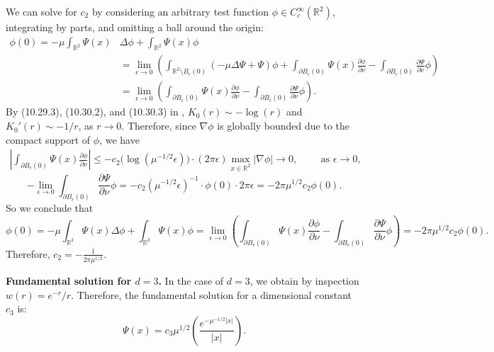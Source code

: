 \documentclass[12pt]{article}
\def\R{{\mathbb R}}
\theoremstyle{plain}
\begin{document}
We can solve for $c_{2}$ by considering an arbitrary test function $\phi \in C_{c}^{\infty}(\R^{2})$, integrating by parts, and omitting a ball around the origin:
\begin{align*}
\phi(0) = -\mu \int_{\R^{2}} \Psi(x)& \Delta \phi + \int_{\R^{2}} \Psi(x) \phi \\
&= \lim_{\epsilon \to 0} \left(\int_{\R^{2} \setminus B_{\epsilon}(0)} (-\mu \Delta \Psi + \Psi) \phi + \int_{\partial B_{\epsilon}(0)} \Psi(x) \frac{\partial \phi}{\partial \nu} - \int_{\partial B_{\epsilon}(0)} \frac{\partial \Psi}{\partial \nu} \phi\right) \\
&= \lim_{\epsilon \to 0} \left(\int_{\partial B_{\epsilon}(0)} \Psi(x) \frac{\partial \phi}{\partial \nu} - \int_{\partial B_{\epsilon}(0)} \frac{\partial \Psi}{\partial \nu} \phi\right).
\end{align*}
By (10.29.3), (10.30.2), and (10.30.3) in \cite{DLMF}, $K_{0}(r) \sim -\log(r)$ and $K_{0}'(r) \sim -1/r$, as $r \to 0$. Therefore, since $\nabla \phi$ is globally bounded due to the compact support of $\phi$, we have
\begin{align}\label{smoothgreen1}
\left|\int_{\partial B_{\epsilon}(0)} \Psi(x)\frac{\partial \phi}{\partial \nu}\right| \le -c_{2} \Big(\log(\mu^{-1/2} \epsilon)\Big) \cdot (2\pi \epsilon) \max_{x \in \R^{2}} |\nabla \phi| \to 0, \qquad \text{ as } \epsilon \to 0,
\end{align}
\begin{equation*}
-\lim_{\epsilon \to 0} \int_{\partial B_{\epsilon}(0)} \frac{\partial \Psi}{\partial \nu} \phi = -c_{2} (\mu^{-1/2} \epsilon)^{-1} \cdot \phi(0) \cdot 2\pi \epsilon = -2\pi\mu^{1/2} c_{2}\phi(0).
\end{equation*}
So we conclude that
\begin{equation*}
\phi(0) = -\mu \int_{\R^{2}} \Psi(x) \Delta \phi + \int_{\R^{2}} \Psi(x) \phi = \lim_{\epsilon \to 0} \left(\int_{\partial B_{\epsilon}(0)} \Psi(x) \frac{\partial \phi}{\partial \nu} - \int_{\partial B_{\epsilon}(0)} \frac{\partial \Psi}{\partial \nu} \phi\right) = -2\pi\mu^{1/2} c_{2}\phi(0).
\end{equation*}
Therefore, $\displaystyle c_{2} = -\frac{1}{2\pi \mu^{1/2}}. $
\bigskip

\noindent \textbf{Fundamental solution for $d = 3$.} In the case of $d = 3$, we obtain by inspection $w(r) = e^{-r}/r$. Therefore, the fundamental solution for a dimensional constant $c_{3}$ is:
\begin{equation*}
\Psi(x) = c_{3} \mu^{1/2} \left(\frac{e^{-\mu^{-1/2}|x|}}{|x|}\right).
\end{equation*}
\end{document}
